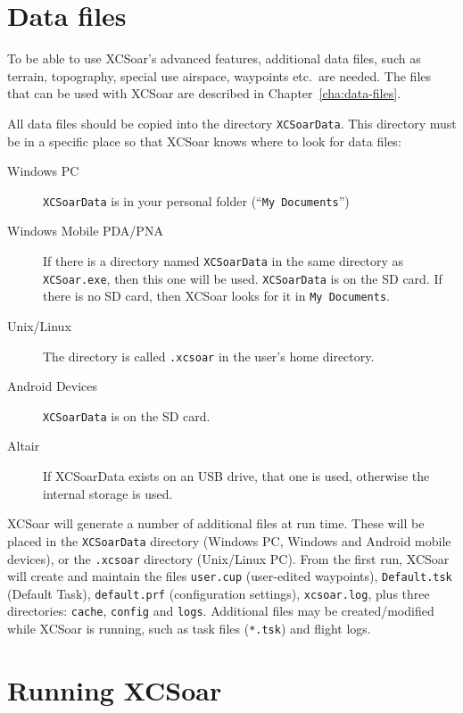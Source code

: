 \section{Data files}\label{sec:data files}

To be able to use XCSoar's advanced features, additional data files, such as
terrain, topography, special use airspace, waypoints etc.\ are needed. The files
that can be used with XCSoar are described in Chapter~\ref{cha:data-files}.

All data files should be copied into the directory
\texttt{XCSoarData}.  This directory must be in a specific place
so that XCSoar knows where to look for data files:

\begin{description}
\item[Windows PC]
\texttt{XCSoarData} is in your personal folder (``\texttt{My
Documents}'')
\item[Windows Mobile PDA/PNA]
If there is a directory named \texttt{XCSoarData} in the same
directory as \texttt{XCSoar.exe}, then this one will be used.
\texttt{XCSoarData} is on the SD card.  If there is no SD card, then
XCSoar looks for it in \texttt{My Documents}.
\item[Unix/Linux]
The directory is called \verb|.xcsoar| in the user's home directory.
\item[Android Devices]
\texttt{XCSoarData} is on the SD card.
\item[Altair]
If XCSoarData exists on an USB drive, that one is used, otherwise the
internal storage is used.
\end{description}


XCSoar will generate a number of additional files at run time.  These
will be placed in the  \texttt{XCSoarData} directory (Windows PC, 
Windows and Android mobile devices), or the \texttt{.xcsoar} directory (Unix/Linux
PC).  From the first run, XCSoar will create and maintain the files
\texttt{user.cup} (user-edited waypoints),
\texttt{Default.tsk} (Default Task),  
\texttt{default.prf} 
(configuration settings),
\texttt{xcsoar.log}, 
plus three directories: \texttt{cache},
\texttt{config} and \texttt{logs}.  Additional files may be
created/modified while XCSoar is running, such as task files
(\texttt{*.tsk}) and flight logs.


\section{Running XCSoar}

